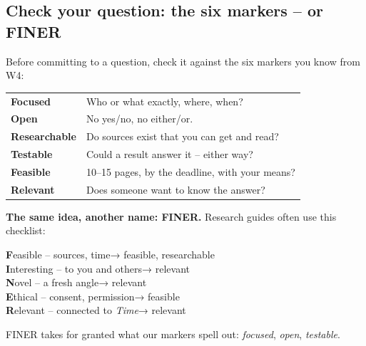 \subsection{Check your question: the six markers – or FINER}
\begin{minipage}[t]{0.56\linewidth}\vspace{0pt}
Before committing to a question, check it against the six markers you know from W4:
\par\vspace{0.3ex}
{\small\renewcommand{\arraystretch}{1.08}%
\begin{tabularx}{\linewidth}{@{}>{\bfseries}l X@{}}
Focused & Who or what exactly, where, when?\\
Open & No yes/no, no either/or.\\
Researchable & Do sources exist that you can get and read?\\
Testable & Could a result answer it – either way?\\
Feasible & 10–15 pages, by the deadline, with your means?\\
Relevant & Does someone want to know the answer?\\
\end{tabularx}}
\end{minipage}\hfill
\begin{minipage}[t]{0.41\linewidth}\vspace{0pt}
\begin{hinweis}[colback=sectint,colframe=sec]
{\small\textbf{The same idea, another name: FINER.} Research guides often use this checklist:\par\vspace{0.3ex}
\textbf{F}easible – sources, time\hfill\textcolor{muted}{→ feasible, researchable}\\
\textbf{I}nteresting – to you and others\hfill\textcolor{muted}{→ relevant}\\
\textbf{N}ovel – a fresh angle\hfill\textcolor{muted}{→ relevant}\\
\textbf{E}thical – consent, permission\hfill\textcolor{muted}{→ feasible}\\
\textbf{R}elevant – connected to \emph{Time}\hfill\textcolor{muted}{→ relevant}\par\vspace{0.3ex}
FINER takes for granted what our markers spell out: \emph{focused}, \emph{open}, \emph{testable}.}
\end{hinweis}
\end{minipage}

